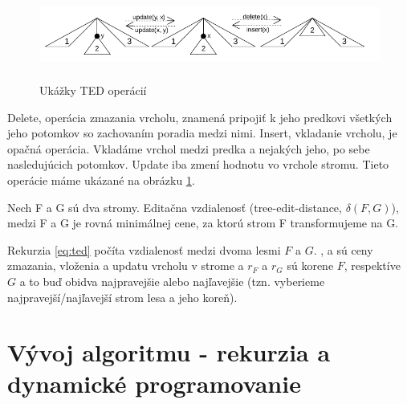 \begin{figure}[H]
\centering
\includegraphics[width=140mm, height=30mm]{../img/TED_operations.png}
\caption{Ukážky TED operácií}
\label{obr:TED_operations}
\end{figure}

Delete, operácia zmazania vrcholu, znamená pripojiť k jeho predkovi všetkých jeho
potomkov so zachovaním poradia medzi nimi. Insert, vkladanie vrcholu, je opačná
operácia. Vkladáme vrchol medzi predka a nejakých jeho, po sebe nasledujúcich
potomkov. Update iba zmení hodnotu vo vrchole stromu.
Tieto operácie máme ukázané na obrázku \ref{obr:TED_operations}.

\begin{definice}
  Nech F a G sú dva stromy. Editačna vzdialenosť (tree-edit-distance, $\delta(F, G)$),
	medzi F a G je rovná minimálnej cene, za ktorú strom F transformujeme na G.
\end{definice}

Rekurzia \ref{eq:ted} počíta vzdialenosť medzi dvoma lesmi $F$ a $G$.
\Cdel, \Cins a \Cupd sú ceny zmazania, vloženia a updatu vrcholu v strome
a $r_{F}$ a $r_{G}$ sú korene $F$, respektíve $G$ a to buď obidva najpravejšie
alebo najľavejšie (tzn. vyberieme najpravejší/najľavejší strom lesa a jeho koreň).







\section{\sloppy Vývoj algoritmu - rekurzia a dynamické programovanie}

